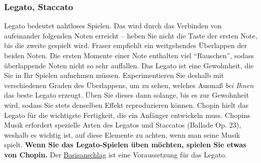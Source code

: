 \subsubsection{Legato, Staccato}
\label{c1iii1c}

Legato bedeutet nahtloses Spielen.
Das wird durch das Verbinden von aufeinander folgenden Noten erreicht -- heben Sie nicht die Taste der ersten Note, bis die zweite gespielt wird.
Fraser empfiehlt ein weitgehendes Überlappen der beiden Noten.
Die ersten Momente einer Note enthalten viel \enquote{Rauschen}, sodass überlappende Noten nicht so sehr auffallen.
Das Legato ist eine Gewohnheit, die Sie in Ihr Spielen aufnehmen müssen.
Experimentieren Sie deshalb mit verschiedenen Graden des Überlappens, um zu sehen, welches Ausmaß \textit{bei Ihnen} das beste Legato erzeugt.
Üben Sie dieses dann solange, bis es zur Gewohnheit wird, sodass Sie stets denselben Effekt reproduzieren können.
Chopin hielt das Legato für die wichtigste Fertigkeit, die ein Anfänger entwickeln muss.
Chopins Musik erfordert spezielle Arten des Legatos und Staccatos (Ballade Op. 23), weshalb es wichtig ist, auf diese Elemente zu achten, wenn man seine Musik spielt.
\textbf{Wenn Sie das Legato-Spielen üben möchten, spielen Sie etwas von Chopin.}
Der \hyperref[c1iii1a1]{Basisanschlag} ist eine Voraussetzung für das Legato.

